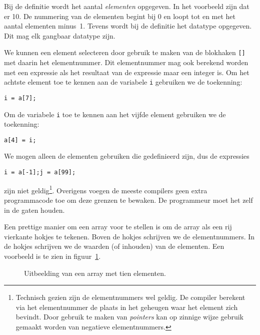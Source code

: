 Bij de definitie wordt het aantal \textsl{elementen} opgegeven. In het voorbeeld zijn dat er 10. De nummering van de elementen begint bij 0 en loopt tot en met het aantal elementen minus~1. Tevens wordt bij de definitie het datatype opgegeven. Dit mag elk gangbaar datatype zijn.

We kunnen een element selecteren door gebruik te maken van de blokhaken \texttt{[]}\indexop{[]} met daarin het elementnummer. Dit elementnummer mag ook berekend worden met een expressie als het resultaat van de expressie maar een integer is. Om het achtste element toe te kennen aan de variabele \texttt{i} gebruiken we de toekenning:

\hspace*{1em}\texttt{i = a[7];}

Om de variabele \texttt{i} toe te kennen aan het vijfde element gebruiken we de toekenning:

\hspace*{1em}\texttt{a[4] = i;}

We mogen alleen de elementen gebruiken die gedefinieerd zijn, dus de expressies

\hspace*{1em}\texttt{i = a[-1];}\quad\texttt{j = a[99];}

zijn niet geldig\footnote{Technisch gezien zijn de elementnummers wel geldig. De compiler berekent via het elementnummer de plaats in het geheugen waar het element zich bevindt. Door gebruik te maken van \textsl{pointers} kan op zinnige wijze gebruik gemaakt worden van negatieve elementnummers.}. Overigens voegen de meeste compilers geen extra programmacode toe om deze grenzen te bewaken. De programmeur moet het zelf in de gaten houden.

Een prettige manier om een array voor te stellen is om de array als een rij vierkante hokjes te tekenen. Boven de hokjes schrijven we de elementnummers. In de hokjes schrijven we de waarden (of inhouden) van de elementen. Een voorbeeld is te zien in figuur~\ref{fig:arryinmem}.

\begin{figure}[!ht]
\centering
{}
\caption{Uitbeelding van een array met tien elementen.}
\label{fig:arryinmem}
\end{figure}

